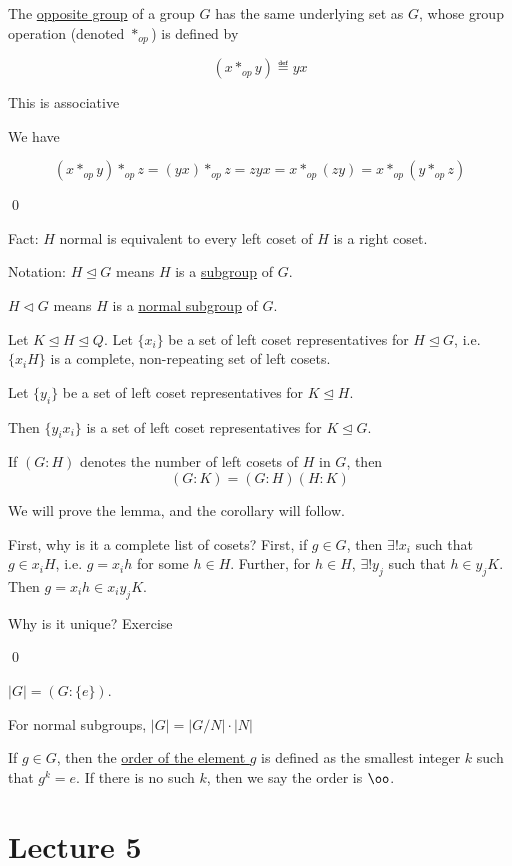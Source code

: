 \documentclass[x11names,reqno,14pt]{extarticle}
\begin{document}
The \underline{opposite group} of a group $G$ has the same underlying set as $G$, whose group operation (denoted $*_{op}$) is defined by

\[
(x*_{op}y) \eqdef yx
\]

\claim This is associative

\proof

We have 

\[
(x*_{op}y)*_{op}z = (yx)*_{op}z = zyx = x*_{op}(zy) = x*_{op}(y*_{op}z)
\]

\qed

Fact: $H$ normal is equivalent to every left coset of $H$ is a right coset.

Notation: $H\unlhd G$ means $H$ is a \underline{subgroup} of $G$. 

$H\lhd G$ means $H$ is a \underline{normal subgroup} of $G$. 

\lem Let $K\unlhd H \unlhd Q$. Let $\{x_i\}$ be a set of left coset representatives for $H\unlhd G$, i.e. $\{x_iH\}$ is a complete, non-repeating set of left cosets. 

Let $\{y_i\}$ be a set of left coset representatives for $K\unlhd H$. 

Then $\{y_ix_i\}$ is a set of left coset representatives for $K \unlhd G$. 

\cor

If $(G:H)$ denotes the number of left cosets of $H$ in $G$, then 
\[
(G:K) = (G:H)(H:K)
\]

\proof

We will prove the lemma, and the corollary will follow. 

First, why is it a complete list of cosets? First, if $g \in G$, then $\exists ! x_i$ such that $g \in x_iH$, i.e. $g = x_ih$ for some $h \in H$. Further, for $h \in H$, $\exists!y_j$ such that $h \in y_jK$. Then $g = x_ih \in x_iy_jK$.

Why is it unique? Exercise 

\qed


$|G| = (G:\{e\})$. 

\cor

For normal subgroups, $|G| = |G/N|\cdot|N|$


If $g \in G$, then the \underline{order of the element $g$} is defined as the smallest integer $k$ such that $g^k = e$. If there is no such $k$, then we say the order is $\oo$. 

\section*{Lecture 5}
\end{document}
